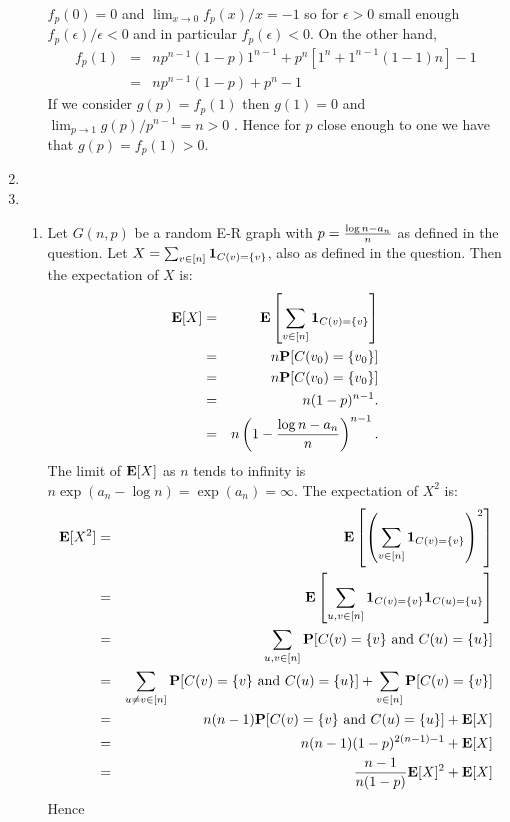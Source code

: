 \documentclass[11pt]{article} \usepackage{amssymb}
\newcommand{\E}{{\bf E}} \newcommand{\Cov}{{\bf Cov}}
\begin{document}
\begin{enumerate}
\begin{enumerate}
    $f_p(0)=0$ and $\lim_{x\to 0}f_p(x)/x=-1$
    so for $\epsilon>0$ small enough $f_p(\epsilon)/\epsilon<0$ and in particular 
    $f_p(\epsilon)<0$. On the other hand,
    \begin{eqnarray*}
      f_p(1)&=&np^{n-1}(1-p)1^{n-1}+p^n\left[ 1^n+1^{n-1}(1-1)n \right]-1
      \\ &=& np^{n-1}(1-p)+p^n-1
    \end{eqnarray*}
    If we consider $g(p)=f_p(1)$ 
    then $g(1)=0$ and $\lim_{p\to 1}g(p)/p^{n-1}=n>0$ . Hence for
    $p$ close enough to one we have that $g(p)=f_p(1)>0$. 
  \end{enumerate}
  \item
  \item
    \begin{enumerate}
    \item 
      Let $G(n,p)$ be a random E-R graph with $p={\log n-a_n\over n}$ as defined
      in the question. Let $X=\sum_{v\in[n]}{\bf 1}_{C(v)=\{v\}}$, also as defined
      in the question. Then the expectation of $X$ is:
      \begin{eqnarray*}
        \E[X] &=& \E\left[\sum_{v\in[n]}{\bf 1}_{C(v)=\{v\}}\right]
        \\ &=& n\P[C(v_0)=\{v_0\}]
        \\ &=& n\P[C(v_0)=\{v_0\}]
        \\ &=& n(1-p)^{n-1}.
        \\ &=& n\left(1-{\log n-a_n\over n}\right)^{n-1}.
      \end{eqnarray*}
      The limit of $\E[X]$ as $n$ tends to infinity is 
      $n\exp(a_n-\log n)=\exp(a_n)=\infty$.
      The expectation of $X^2$ is:
      \begin{eqnarray*}
        \E[X^2] &=& \E\left[\left(\sum_{v\in[n]}{\bf 1}_{C(v)=\{v\}}\right)^2\right]
        \\ &=& \E\left[\sum_{u,v\in[n]}{\bf 1}_{C(v)=\{v\}}{\bf 1}_{C(u)=\{u\}}\right]
        \\ &=& \sum_{u,v\in[n]}\P[C(v)=\{v\} \mbox{ and } C(u)=\{u\}]
        \\ &=& \sum_{u\neq v\in[n]}\P[C(v)=\{v\} \mbox{ and } C(u)=\{u\}]+\sum_{v\in[n]}\P[C(v)=\{v\}]
        \\ &=& n(n-1)\P[C(v)=\{v\} \mbox{ and } C(u)=\{u\}]+\E[X]
        \\ &=& n(n-1)(1-p)^{2(n-1)-1}+\E[X]
        \\ &=& {n-1\over n(1-p)}\E[X]^2+\E[X]
      \end{eqnarray*}
      Hence

\end{enumerate}
\end{enumerate}
\end{document}
